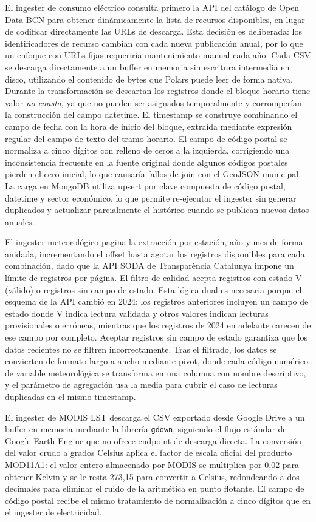 \documentclass[12pt, a4paper]{article}
\begin{document}
El ingester de consumo eléctrico consulta primero la API del catálogo de Open Data BCN para obtener dinámicamente la lista de recursos disponibles, en lugar de codificar directamente las URLs de descarga. Esta decisión es deliberada: los identificadores de recurso cambian con cada nueva publicación anual, por lo que un enfoque con URLs fijas requeriría mantenimiento manual cada año. Cada CSV se descarga directamente a un buffer en memoria sin escritura intermedia en disco, utilizando el contenido de bytes que Polars puede leer de forma nativa. Durante la transformación se descartan los registros donde el bloque horario tiene valor \textit{no consta}, ya que no pueden ser asignados temporalmente y corromperían la construcción del campo datetime. El timestamp se construye combinando el campo de fecha con la hora de inicio del bloque, extraída mediante expresión regular del campo de texto del tramo horario. El campo de código postal se normaliza a cinco dígitos con relleno de ceros a la izquierda, corrigiendo una inconsistencia frecuente en la fuente original donde algunos códigos postales pierden el cero inicial, lo que causaría fallos de join con el GeoJSON municipal. La carga en MongoDB utiliza upsert por clave compuesta de código postal, datetime y sector económico, lo que permite re-ejecutar el ingester sin generar duplicados y actualizar parcialmente el histórico cuando se publican nuevos datos anuales.

El ingester meteorológico pagina la extracción por estación, año y mes de forma anidada, incrementando el offset hasta agotar los registros disponibles para cada combinación, dado que la API SODA de Transparència Catalunya impone un límite de registros por página. El filtro de calidad acepta registros con estado V (válido) o registros sin campo de estado. Esta lógica dual es necesaria porque el esquema de la API cambió en 2024: los registros anteriores incluyen un campo de estado donde V indica lectura validada y otros valores indican lecturas provisionales o erróneas, mientras que los registros de 2024 en adelante carecen de ese campo por completo. Aceptar registros sin campo de estado garantiza que los datos recientes no se filtren incorrectamente. Tras el filtrado, los datos se convierten de formato largo a ancho mediante pivot, donde cada código numérico de variable meteorológica se transforma en una columna con nombre descriptivo, y el parámetro de agregación usa la media para cubrir el caso de lecturas duplicadas en el mismo timestamp.

El ingester de MODIS LST descarga el CSV exportado desde Google Drive a un buffer en memoria mediante la librería \texttt{gdown}, siguiendo el flujo estándar de Google Earth Engine que no ofrece endpoint de descarga directa. La conversión del valor crudo a grados Celsius aplica el factor de escala oficial del producto MOD11A1: el valor entero almacenado por MODIS se multiplica por 0,02 para obtener Kelvin y se le resta 273,15 para convertir a Celsius, redondeando a dos decimales para eliminar el ruido de la aritmética en punto flotante. El campo de código postal recibe el mismo tratamiento de normalización a cinco dígitos que en el ingester de electricidad.
\end{document}
